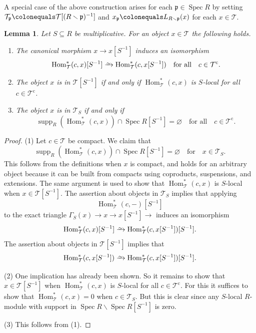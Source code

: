 \documentclass{amsart}[a4]
\newtheorem{lemma}[theorem]{Lemma}
\theoremstyle{definition}
\theoremstyle{remark}
\numberwithin{equation}{section}
\newcommand{\Hom}{\operatorname{Hom}}
\newcommand{\Spec}{\operatorname{Spec}}
\newcommand{\supp}{\operatorname{supp}}
\newcommand{\iso}{\xrightarrow{\raisebox{-.6ex}[0ex][0ex]{$\scriptstyle{\sim}$}}}
\newcommand{\cat}{\mathcal}
\newcommand{\fp}{\mathfrak{p}}
\let\Gamma\varGamma
\begin{document}
A special case of the above construction arises for each
$\fp\in\Spec R$ by setting
$\cat T_\fp\colonequals\cat T[(R\smallsetminus\fp)^{-1}]$ and
$x_\fp\colonequals L_{R\smallsetminus\fp}(x)$ for each $x\in\cat T$.


\begin{lemma}\label{le:S-localisation}
  Let $S\subseteq R$ be multiplicative. For an object $x\in\cat T$ the
  following holds.
\begin{enumerate}
\item  The canonical
  morphism $x\to x[S^{-1}]$ induces an isomorphism
\[\Hom^*_{\cat T}(c,x)[S^{-1}]\iso \Hom^*_{\cat T}(c,x[S^{-1}])\quad\text{for
    all}\quad c\in\cat T^{\mathrm c}.\]
\item The object $x$ is in $\cat T[S^{-1}]$ if and only if
  $\Hom^*_{\cat T}(c,x)$ is $S$-local for all $c\in\cat T^{\mathrm c}$.
\item  The object $x$ is in $\cat T_S$ if and only if \[\supp_R(\Hom^*_{\cat T}(c,x))\cap\Spec R[S^{-1}]=\varnothing
\quad\text{for all}\quad c\in\cat T^{\mathrm c}.\]
\end{enumerate}
\end{lemma}

\begin{proof}
(1)  Let $c\in\cat T$ be compact. We claim that
\[\supp_R(\Hom^*_{\cat T}(c,x))\cap\Spec R[S^{-1}]=\varnothing\quad\text{for}\quad x\in \cat T_S.\]
This follows from the definitions when $x$ is compact, and holds for
an arbitrary object because it can be built from compacts using
coproducts, suspensions, and extensions. The same argument is used to
show that $\Hom^*_{\cat T}(c,x)$ is $S$-local when $x\in\cat T[S^{-1}]$.
The assertion about objects in $\cat T_S$ implies
that applying \[\Hom^*_{\cat T}(c,-)[S^{-1}]\] to the exact triangle
$\Gamma_S(x)\to x\to x[S^{-1}]\to $ induces an
isomorphism
  \[\Hom^*_{\cat T}(c,x)[S^{-1}]\iso \Hom^*_{\cat T}(c,x[S^{-1}])[S^{-1}].\]
The assertion about objects in $\cat T[S^{-1}]$ implies
that 
\[\Hom^*_{\cat T}(c,x[S^{-1}])\iso \Hom^*_{\cat T}(c,x[S^{-1}])[S^{-1}].\]

(2) One implication has already been shown. So it remains to show that
$x\in\cat T[S^{-1}]$ when $\Hom^*_{\cat T}(c,x)$ is $S$-local for
all $c\in\cat T^{\mathrm c}$. For this it suffices to show that $\Hom^*_{\cat T}(c,x)=0$
when $c\in \cat T_S$. But this is clear since any
$S$-local $R$-module with support in $\Spec R\smallsetminus \Spec
R[S^{-1}]$ is zero.

(3) This follows from (1).
\end{proof}
\end{document}

